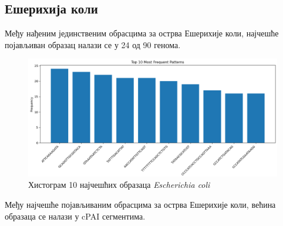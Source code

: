 \documentclass[12pt]{article}
\begin{document}
\subsection{Ешерихија коли}

Међу нађеним јединственим обрасцима за острва Ешерихије коли, најчешће појављиван образац налази се у 24 од 90 генома.

\begin{figure}[htbp]
    \centering
    \vspace{0.2cm}
    \includegraphics[width=\linewidth]{images/top_10_hist.png}
    \caption{Хистограм 10 најчешћих образаца \textit{Escherichia coli}}
    \vspace{0.5cm}
    \label{fig:top10hist}
\end{figure}


Међу најчешће појављиваним обрасцима за острва Ешерихије коли, већина образаца се налази у cPAI сегментима.
\end{document}
